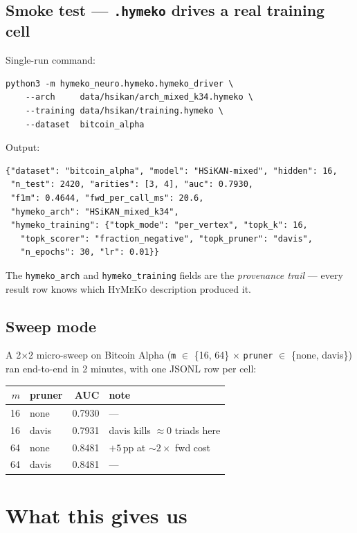 \documentclass[11pt,a4paper]{article}
\newcommand{\HyMeKo}{\textsc{HyMeKo}}
\newcommand{\code}[1]{\texttt{\small #1}}
\begin{document}
\subsection{Smoke test --- \code{.hymeko} drives a real training cell}

Single-run command:
\begin{lstlisting}
python3 -m hymeko_neuro.hymeko.hymeko_driver \
    --arch     data/hsikan/arch_mixed_k34.hymeko \
    --training data/hsikan/training.hymeko \
    --dataset  bitcoin_alpha
\end{lstlisting}

Output:
\begin{lstlisting}
{"dataset": "bitcoin_alpha", "model": "HSiKAN-mixed", "hidden": 16,
 "n_test": 2420, "arities": [3, 4], "auc": 0.7930,
 "f1m": 0.4644, "fwd_per_call_ms": 20.6,
 "hymeko_arch": "HSiKAN_mixed_k34",
 "hymeko_training": {"topk_mode": "per_vertex", "topk_k": 16,
   "topk_scorer": "fraction_negative", "topk_pruner": "davis",
   "n_epochs": 30, "lr": 0.01}}
\end{lstlisting}

The \code{hymeko\_arch} and \code{hymeko\_training} fields are the
\emph{provenance trail} — every result row knows which \HyMeKo{}
description produced it.

\subsection{Sweep mode}

A 2$\times$2 micro-sweep on Bitcoin Alpha (\code{m} $\in$
\{16, 64\} $\times$ \code{pruner} $\in$ \{none, davis\}) ran end-to-end
in 2 minutes, with one JSONL row per cell:

\begin{center}
\begin{tabular}{rlrl}
\toprule
$m$ & pruner & AUC      & note \\
\midrule
16  & none   & 0.7930   & --- \\
16  & davis  & 0.7931   & davis kills $\approx 0$ triads here \\
64  & none   & 0.8481   & $+5\,$pp at $\sim 2\times$ fwd cost \\
64  & davis  & 0.8481   & --- \\
\bottomrule
\end{tabular}
\end{center}

\section{What this gives us}
\end{document}
